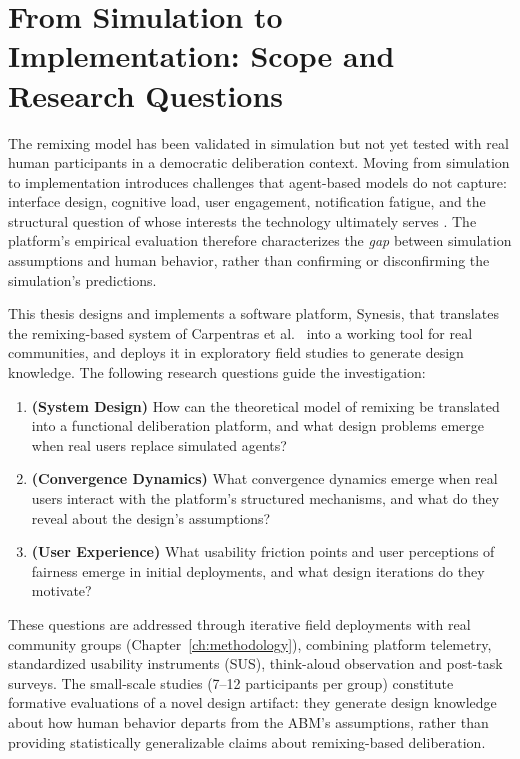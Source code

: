 \documentclass[a4paper, 12pt, twoside]{iviathesis}
\begin{document}
\section{From Simulation to Implementation: Scope and Research Questions}
\label{sec:research-questions}

The remixing model has been validated in simulation but not yet tested with real human participants in a democratic deliberation context. Moving from simulation to implementation introduces challenges that agent-based models do not capture: interface design, cognitive load, user engagement, notification fatigue, and the structural question of whose interests the technology ultimately serves \cite{winner1980}. The platform's empirical evaluation therefore characterizes the \textit{gap} between simulation assumptions and human behavior, rather than confirming or disconfirming the simulation's predictions.

This thesis designs and implements a software platform, Synesis, that translates the remixing-based system of Carpentras et al.\ \cite{carpentras_empowering_2024, carpentras_wisdom_2025} into a working tool for real communities, and deploys it in exploratory field studies to generate design knowledge. The following research questions guide the investigation:

\begin{enumerate}
    \item[\textbf{RQ1}] \textbf{(System Design)} How can the theoretical model of remixing be translated into a functional deliberation platform, and what design problems emerge when real users replace simulated agents?
    \item[\textbf{RQ2}] \textbf{(Convergence Dynamics)} What convergence dynamics emerge when real users interact with the platform's structured mechanisms, and what do they reveal about the design's assumptions?
    \item[\textbf{RQ3}] \textbf{(User Experience)} What usability friction points and user perceptions of fairness emerge in initial deployments, and what design iterations do they motivate?
\end{enumerate}

These questions are addressed through iterative field deployments with real community groups (Chapter~\ref{ch:methodology}), combining platform telemetry, standardized usability instruments (SUS), think-aloud observation and post-task surveys. The small-scale studies (7--12 participants per group) constitute formative evaluations of a novel design artifact: they generate design knowledge about how human behavior departs from the ABM's assumptions, rather than providing statistically generalizable claims about remixing-based deliberation.
\end{document}
